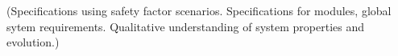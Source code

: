 
(Specifications using safety factor scenarios. Specifications for modules, global sytem requirements.
Qualitative understanding of system properties and evolution.)

